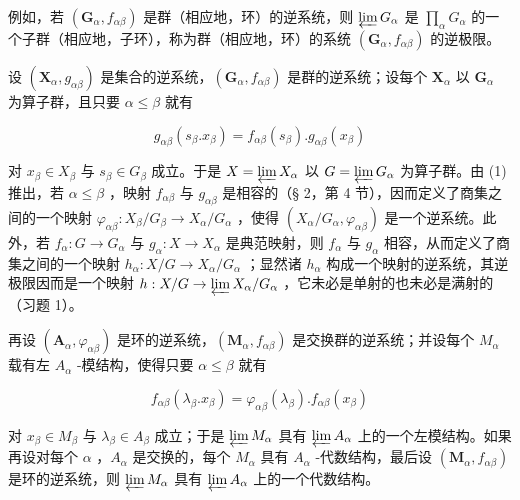 例如，若 \((\mathbf{G}_{\alpha}, f_{\alpha\beta})\) 是群（相应地，环）的逆系统，则 \(\varprojlim G_{\alpha}\) 是 \(\prod_{\alpha} G_{\alpha}\) 的一个子群（相应地，子环），称为群（相应地，环）的系统 \((\mathbf{G}_{\alpha}, f_{\alpha\beta})\) 的逆极限。

设 \((\mathbf{X}_{\alpha}, g_{\alpha \beta})\) 是集合的逆系统，\((\mathbf{G}_{\alpha}, f_{\alpha \beta})\) 是群的逆系统；设每个 \(\mathbf{X}_{\alpha}\) 以 \(\mathbf{G}_{\alpha}\) 为算子群，且只要 \(\alpha \leqslant \beta\) 就有

\[
g _ {\alpha \beta} (s _ {\beta}. x _ {\beta}) = f _ {\alpha \beta} (s _ {\beta}). g _ {\alpha \beta} (x _ {\beta})\tag{1}
\]

对 \(x_{\beta} \in X_{\beta}\) 与 \(s_{\beta} \in G_{\beta}\) 成立。于是 \(X = \varprojlim X_{\alpha}\) 以 \(G = \varprojlim G_{\alpha}\) 为算子群。由 (1) 推出，若 \(\alpha \leqslant \beta\) ，映射 \(f_{\alpha \beta}\) 与 \(g_{\alpha \beta}\) 是相容的（§ 2，第 4 节），因而定义了商集之间的一个映射 \(\varphi_{\alpha \beta}: X_{\beta}/G_{\beta} \to X_{\alpha}/G_{\alpha}\) ，使得 \((X_{\alpha}/G_{\alpha}, \varphi_{\alpha \beta})\) 是一个逆系统。此外，若 \(f_{\alpha}: G \to G_{\alpha}\) 与 \(g_{\alpha}: X \to X_{\alpha}\) 是典范映射，则 \(f_{\alpha}\) 与 \(g_{\alpha}\) 相容，从而定义了商集之间的一个映射 \(h_{\alpha}: X/G \to X_{\alpha}/G_{\alpha}\) ；显然诸 \(h_{\alpha}\) 构成一个映射的逆系统，其逆极限因而是一个映射 \(h: X/G \to \varprojlim X_{\alpha}/G_{\alpha}\) ，它未必是单射的也未必是满射的（习题 1）。

再设 \((\mathbf{A}_{\alpha}, \varphi_{\alpha\beta})\) 是环的逆系统，\((\mathbf{M}_{\alpha}, f_{\alpha\beta})\) 是交换群的逆系统；并设每个 \(M_{\alpha}\) 载有左 \(A_{\alpha}\) -模结构，使得只要 \(\alpha \leqslant \beta\) 就有

\[
f _ {\alpha \beta} (\lambda_ {\beta}. x _ {\beta}) = \varphi_ {\alpha \beta} (\lambda_ {\beta}). f _ {\alpha \beta} (x _ {\beta})\tag{2}
\]

对 \(x_{\beta} \in M_{\beta}\) 与 \(\lambda_{\beta} \in A_{\beta}\) 成立；于是 \(\varprojlim M_{\alpha}\) 具有 \(\varprojlim A_{\alpha}\) 上的一个左模结构。如果再设对每个 \(\alpha\) ，\(A_{\alpha}\) 是交换的，每个 \(M_{\alpha}\) 具有 \(A_{\alpha}\) -代数结构，最后设 \((\mathbf{M}_{\alpha}, f_{\alpha\beta})\) 是环的逆系统，则 \(\varprojlim M_{\alpha}\) 具有 \(\varprojlim A_{\alpha}\) 上的一个代数结构。


